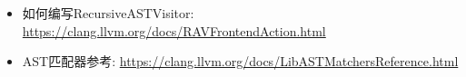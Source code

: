 \begin{itemize}
\item
如何编写RecursiveASTVisitor: \url{https://clang.llvm.org/docs/RAVFrontendAction.html}

\item
AST匹配器参考: \url{https://clang.llvm.org/docs/LibASTMatchersReference.html}
\end{itemize}